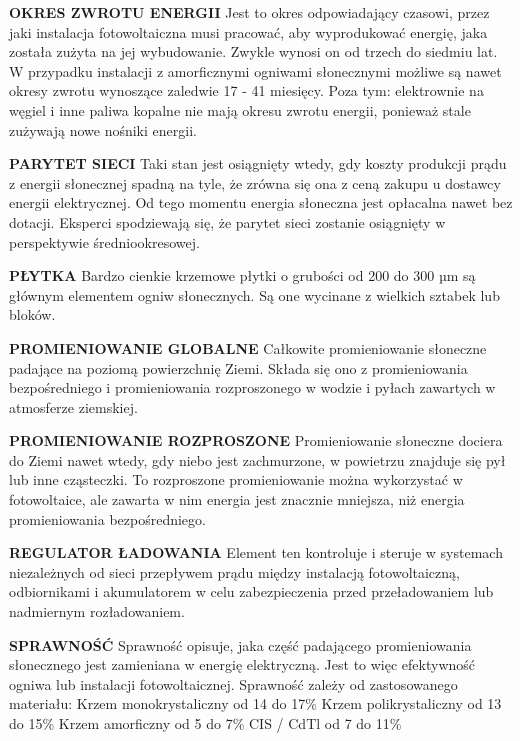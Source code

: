 \documentclass[12pt,a4paper]{article}
\begin{document}
\textbf{OKRES ZWROTU ENERGII}
Jest to okres odpowiadający czasowi, przez jaki instalacja fotowoltaiczna musi pracować, aby wyprodukować energię, jaka została zużyta na jej wybudowanie. Zwykle wynosi on od trzech do siedmiu lat. W przypadku instalacji z amorficznymi ogniwami słonecznymi możliwe są nawet okresy zwrotu wynoszące zaledwie 17 - 41 miesięcy. Poza tym: elektrownie na węgiel i inne paliwa kopalne nie mają okresu zwrotu energii, ponieważ stale zużywają nowe nośniki energii.


\textbf{PARYTET SIECI}
Taki stan jest osiągnięty wtedy, gdy koszty produkcji prądu z energii słonecznej spadną na tyle, że zrówna się ona z ceną zakupu u dostawcy energii elektrycznej. Od tego momentu energia słoneczna jest opłacalna nawet bez dotacji. Eksperci spodziewają się, że parytet sieci zostanie osiągnięty w perspektywie średniookresowej.


\textbf{PŁYTKA}
Bardzo cienkie krzemowe płytki o grubości od 200 do 300 µm są głównym elementem ogniw słonecznych. Są one wycinane z wielkich sztabek lub bloków.


\textbf{PROMIENIOWANIE GLOBALNE}
Całkowite promieniowanie słoneczne padające na poziomą powierzchnię Ziemi. Składa się ono z promieniowania bezpośredniego i promieniowania rozproszonego w wodzie i pyłach zawartych w atmosferze ziemskiej.


\textbf{PROMIENIOWANIE ROZPROSZONE}
Promieniowanie słoneczne dociera do Ziemi nawet wtedy, gdy niebo jest zachmurzone, w powietrzu znajduje się pył lub inne cząsteczki. To rozproszone promieniowanie można wykorzystać w fotowoltaice, ale zawarta w nim energia jest znacznie mniejsza, niż energia promieniowania bezpośredniego.


\textbf{REGULATOR ŁADOWANIA}
Element ten kontroluje i steruje w systemach niezależnych od sieci przepływem prądu między instalacją fotowoltaiczną, odbiornikami i akumulatorem w celu zabezpieczenia przed przeładowaniem lub nadmiernym rozładowaniem.


\textbf{SPRAWNOŚĆ}
Sprawność opisuje, jaka część padającego promieniowania słonecznego jest zamieniana w energię elektryczną. Jest to więc efektywność ogniwa lub instalacji fotowoltaicznej. Sprawność zależy od zastosowanego materiału:
Krzem monokrystaliczny	od 14 do 17\%
Krzem polikrystaliczny	od 13 do 15\%
Krzem amorficzny	od 5 do 7\%
CIS / CdTl	od 7 do 11\%
\end{document}
